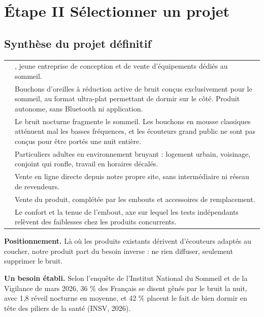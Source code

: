 \clearpage
\section{Étape II \textendash{} Sélectionner un projet}

\subsection{Synthèse du projet définitif}

\begin{center}
\begin{tabularx}{\textwidth}{P{3.6cm}L}
\toprule
{} & \nomentreprise{}, jeune entreprise de conception et de vente
d'équipements dédiés au sommeil. \\
 & Bouchons d'oreilles à réduction active de bruit conçus
exclusivement pour le sommeil, au format ultra-plat permettant de dormir sur le
côté. Produit autonome, sans Bluetooth ni application. \\
 & Le bruit nocturne fragmente le sommeil. Les bouchons
en mousse classiques atténuent mal les basses fréquences, et les écouteurs
grand public ne sont pas conçus pour être portés une nuit entière. \\
 & Particuliers adultes en environnement bruyant : logement
urbain, voisinage, conjoint qui ronfle, travail en horaires décalés. \\
 & Vente en ligne directe depuis notre propre site, sans
intermédiaire ni réseau de revendeurs. \\
 & Vente du produit, complétée par les embouts et accessoires de
remplacement. \\
 & Le confort et la tenue de l'embout, axe sur lequel les
tests indépendants relèvent des faiblesses chez les produits concurrents. \\
\bottomrule
\end{tabularx}
\end{center}

\textbf{Positionnement.} Là où les produits existants dérivent d'écouteurs
adaptés au coucher, notre produit part du besoin inverse : ne rien diffuser,
seulement supprimer le bruit.

\textbf{Un besoin établi.} Selon l'enquête de l'Institut National du Sommeil et
de la Vigilance de mars 2026, 36 \% des Français se disent gênés par le bruit
la nuit, avec 1,8 réveil nocturne en moyenne, et 42 \% placent le fait de bien
dormir en tête des piliers de la santé (INSV, 2026).

